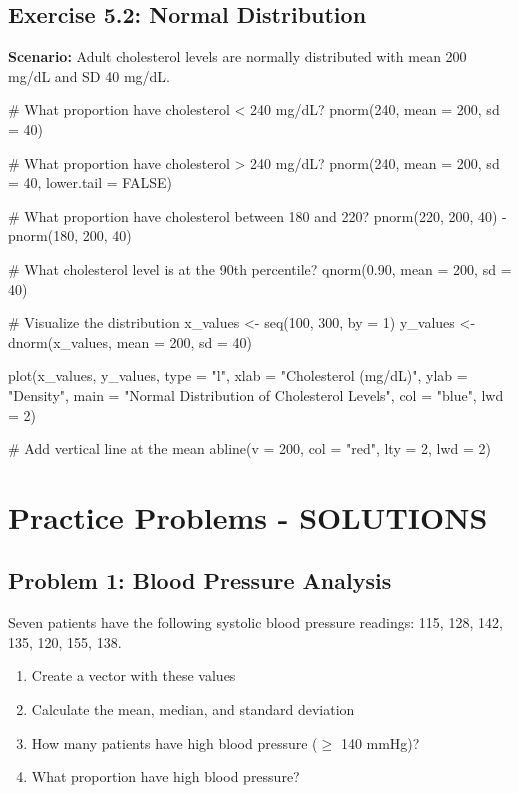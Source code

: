 \documentclass[11pt]{article}
\begin{document}
\subsection{Exercise 5.2: Normal Distribution}

\textbf{Scenario:} Adult cholesterol levels are normally distributed with mean 200 mg/dL and SD 40 mg/dL.

\begin{rcode}
# What proportion have cholesterol < 240 mg/dL?
pnorm(240, mean = 200, sd = 40)

# What proportion have cholesterol > 240 mg/dL?
pnorm(240, mean = 200, sd = 40, lower.tail = FALSE)

# What proportion have cholesterol between 180 and 220?
pnorm(220, 200, 40) - pnorm(180, 200, 40)

# What cholesterol level is at the 90th percentile?
qnorm(0.90, mean = 200, sd = 40)

# Visualize the distribution
x_values <- seq(100, 300, by = 1)
y_values <- dnorm(x_values, mean = 200, sd = 40)

plot(x_values, y_values,
     type = "l",
     xlab = "Cholesterol (mg/dL)",
     ylab = "Density",
     main = "Normal Distribution of Cholesterol Levels",
     col = "blue",
     lwd = 2)

# Add vertical line at the mean
abline(v = 200, col = "red", lty = 2, lwd = 2)
\end{rcode}

\section{Practice Problems - SOLUTIONS}

\subsection{Problem 1: Blood Pressure Analysis}

Seven patients have the following systolic blood pressure readings: 115, 128, 142, 135, 120, 155, 138.

\begin{enumerate}[label=\alph*)]
\item Create a vector with these values
\item Calculate the mean, median, and standard deviation
\item How many patients have high blood pressure ($\geq$ 140 mmHg)?
\item What proportion have high blood pressure?
\end{enumerate}
\end{document}
